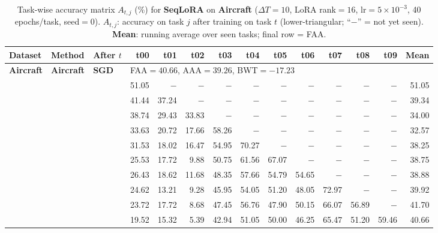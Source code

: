 
\begin{table}[ht]
\centering
\caption{%
  Task-wise accuracy matrix $A_{t,j}$ (\%) for \textbf{SeqLoRA} on \textbf{Aircraft} ($\Delta T=10$, LoRA rank$=16$, lr$=5\times10^{-3}$, 40 epochs/task, seed$=0$).
  $A_{t,j}$: accuracy on task $j$ after training on task $t$  (lower-triangular; ``$-$'' = not yet seen).
  \textbf{Mean}: running average over seen tasks; final row = FAA.
}
\label{tab:raw_seqlora_aircraft}
\setlength{\tabcolsep}{2.8pt}
\renewcommand{\arraystretch}{0.88}
\scriptsize
\begin{tabular}{@{}l l l *{11}{r}@{}}
\toprule
\textbf{Dataset} & \textbf{Method} & \textbf{After $t$} & \textbf{t00} & \textbf{t01} & \textbf{t02} & \textbf{t03} & \textbf{t04} & \textbf{t05} & \textbf{t06} & \textbf{t07} & \textbf{t08} & \textbf{t09} & \textbf{Mean} \\
\midrule
\multirow{11}{*}{\textbf{Aircraft}} & \multirow{11}{*}{\textbf{Aircraft}} & \multirow{11}{*}{\textbf{SGD}} & \multicolumn{12}{l}{\quad\small FAA$=40.66$,\; AAA$=39.26$,\; BWT$=-17.23$} \\
 & & $t_{00}$ & 51.05 & $-$ & $-$ & $-$ & $-$ & $-$ & $-$ & $-$ & $-$ & $-$ & 51.05 \\
 & & $t_{01}$ & 41.44 & 37.24 & $-$ & $-$ & $-$ & $-$ & $-$ & $-$ & $-$ & $-$ & 39.34 \\
 & & $t_{02}$ & 38.74 & 29.43 & 33.83 & $-$ & $-$ & $-$ & $-$ & $-$ & $-$ & $-$ & 34.00 \\
 & & $t_{03}$ & 33.63 & 20.72 & 17.66 & 58.26 & $-$ & $-$ & $-$ & $-$ & $-$ & $-$ & 32.57 \\
 & & $t_{04}$ & 31.53 & 18.02 & 16.47 & 54.95 & 70.27 & $-$ & $-$ & $-$ & $-$ & $-$ & 38.25 \\
 & & $t_{05}$ & 25.53 & 17.72 & 9.88 & 50.75 & 61.56 & 67.07 & $-$ & $-$ & $-$ & $-$ & 38.75 \\
 & & $t_{06}$ & 26.43 & 18.62 & 11.68 & 48.35 & 57.66 & 54.79 & 54.65 & $-$ & $-$ & $-$ & 38.88 \\
 & & $t_{07}$ & 24.62 & 13.21 & 9.28 & 45.95 & 54.05 & 51.20 & 48.05 & 72.97 & $-$ & $-$ & 39.92 \\
 & & $t_{08}$ & 23.72 & 17.72 & 8.68 & 47.45 & 56.76 & 47.90 & 50.15 & 66.07 & 56.89 & $-$ & 41.70 \\
 & & $t_{09}$ & 19.52 & 15.32 & 5.39 & 42.94 & 51.05 & 50.00 & 46.25 & 65.47 & 51.20 & 59.46 & 40.66 \\

\end{tabular}
\end{table}
